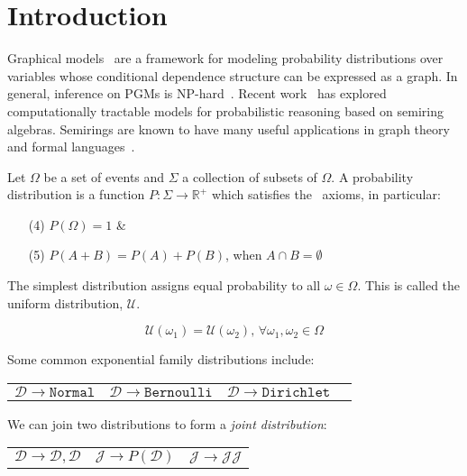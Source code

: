 \documentclass{article}
\begin{document}
\section{Introduction}\label{sec:intro}

Graphical models~\citep{jordan2003introduction,koller2009probabilistic} are a framework for modeling probability distributions over variables whose conditional dependence structure can be expressed as a graph. In general, inference on PGMs is NP-hard~\citep{cooper1990computational}. Recent work~\citep{choi2020probabilistic} has explored computationally tractable models for probabilistic reasoning based on semiring algebras. Semirings are known to have many useful applications in graph theory~\citep{dolan2013fun} and formal languages~\citep{bernady2013efficient}.

Let $\Omega$ be a set of events and $\Sigma$ a collection of subsets of $\Omega$. A probability distribution is a function $P: \Sigma \rightarrow \mathbb{R}^{+}$ which satisfies the~\citet{kolmogorov1933grundbegriffe} axioms, in particular:

\begin{itemize}
    \itemsep-1em
    \item [(4)] $P(\Omega) = 1$ & \\
    \item [(5)] $P(A + B) = P(A) + P(B)$, when $A \cap B = \emptyset$
\end{itemize}


The simplest distribution assigns equal probability to all $\omega \in \Omega$. This is called the uniform distribution, $\mathcal{U}$.

$$
\mathcal U(\omega_1) = \mathcal U(\omega_2)\text{, } \forall \omega_1, \omega_2 \in \Omega
$$

Some common exponential family distributions include:

\begin{tabular}{cccc}
    $\mathcal{D} \rightarrow \mathtt{Normal}$ &
    $\mathcal{D} \rightarrow \mathtt{Bernoulli}$ &
    $\mathcal{D} \rightarrow \mathtt{Dirichlet}$ &
\end{tabular}

We can join two distributions to form a \textit{joint distribution}:

\begin{center}
\begin{tabular}{ccc}
    $\mathcal{D} \rightarrow \mathcal{D}, \mathcal{D}$ &$\mathcal{J} \rightarrow P(\mathcal{D})$ &$\mathcal{J} \rightarrow \mathcal{J}\mathcal{J}$
\end{tabular}
\end{center}
\end{document}
